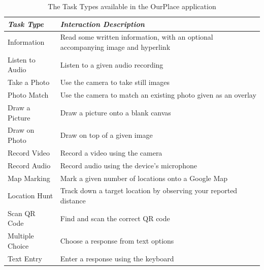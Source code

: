 \documentclass[,hyphens]{sigchi}
\begin{document}
\begin{table}
  \centering
  \begin{tabular}{l|p{55mm}}
    {\small\textit{Task Type}}
    & {\small \textit{Interaction Description}} \\
    \midrule
    \small Information & \small Read some written information, with an optional accompanying image and hyperlink \\
    \small Listen to Audio & \small Listen to a given audio recording \\
    \small Take a Photo & \small Use the camera to take still images \\
    \small Photo Match & \small Use the camera to match an existing photo given as an overlay \\
    \small Draw a Picture & \small Draw a picture onto a blank canvas \\
    \small Draw on Photo & \small Draw on top of a given image \\
    \small Record Video & \small Record a video using the camera \\
    \small Record Audio & \small Record audio using the device's microphone \\
    \small Map Marking & \small Mark a given number of locations onto a Google Map \\
    \small Location Hunt & \small Track down a target location by observing your reported distance \\
    \small Scan QR Code & \small Find and scan the correct QR code \\
    \small Multiple Choice & \small Choose a response from text options \\
    \small Text Entry & \small Enter a response using the keyboard
  \end{tabular}
  \caption{The Task Types available in the OurPlace application}~\label{tab:TaskTypes}
  \vspace{-2em}
\end{table}
\end{document}
